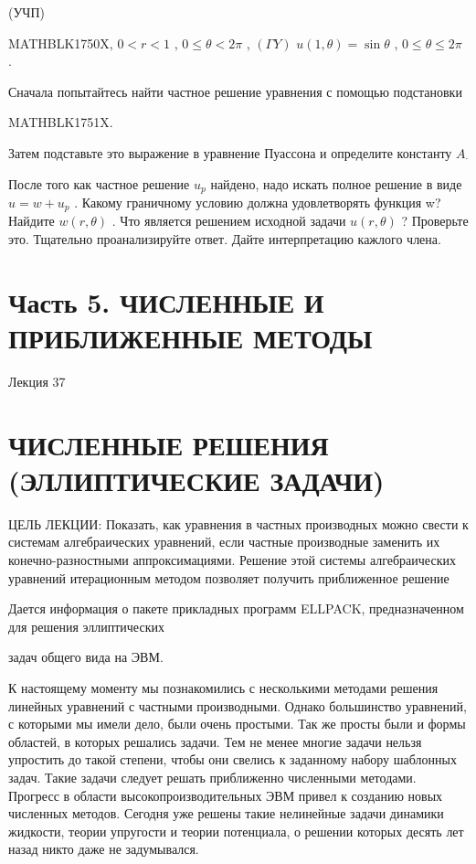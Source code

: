 \documentclass[
]{article}
\begin{document}
{{{(УЧП)

MATHBLK1750X, \(0 < r < 1\) , \(0 \le \theta < 2\pi\) , \((\Gamma Y)\)
\(u(1, \theta) = \sin \theta\) , \(0 \le \theta \le 2\pi\) .

Сначала попытайтесь найти частное решение уравнения с помощью
подстановки

MATHBLK1751X.

Затем подставьте это выражение в уравнение Пуассона и определите
константу \(A_{\cdot}\)

После того как частное решение \(u_p\) найдено, надо искать полное
решение в виде \(u=w+u_p\) . Какому граничному условию должна
удовлетворять функция w? Найдите \(w(r, \theta)\) . Что является
решением исходной задачи \(u(r, \theta)\) ? Проверьте это. Тщательно
проанализируйте ответ. Дайте интерпретацию кажлого члена.

\section{Часть 5. ЧИСЛЕННЫЕ И ПРИБЛИЖЕННЫЕ
МЕТОДЫ}\label{ux447ux430ux441ux442ux44c-5.-ux447ux438ux441ux43bux435ux43dux43dux44bux435-ux438-ux43fux440ux438ux431ux43bux438ux436ux435ux43dux43dux44bux435-ux43cux435ux442ux43eux434ux44b}

Лекция 37

\section{ЧИСЛЕННЫЕ РЕШЕНИЯ (ЭЛЛИПТИЧЕСКИЕ
ЗАДАЧИ)}\label{ux447ux438ux441ux43bux435ux43dux43dux44bux435-ux440ux435ux448ux435ux43dux438ux44f-ux44dux43bux43bux438ux43fux442ux438ux447ux435ux441ux43aux438ux435-ux437ux430ux434ux430ux447ux438}

ЦЕЛЬ ЛЕКЦИИ: Показать, как уравнения в частных производных можно свести
к системам алгебраических уравнений, если частные производные заменить
их конечно-разностными аппроксимациями. Решение этой системы
алгебраических уравнений итерационным методом позволяет получить
приближенное решение

Дается информация о пакете прикладных программ ELLPACK, предназначенном
для решения эллиптических

задач общего вида на ЭВМ.

К настоящему моменту мы познакомились с несколькими методами решения
линейных уравнений с частными производными. Однако большинство
уравнений, с которыми мы имели дело, были очень простыми. Так же просты
были и формы областей, в которых решались задачи. Тем не менее многие
задачи нельзя упростить до такой степени, чтобы они свелись к заданному
набору шаблонных задач. Такие задачи следует решать приближенно
численными методами. Прогресс в области высокопроизводительных ЭВМ
привел к созданию новых численных методов. Сегодня уже решены такие
нелинейные задачи динамики жидкости, теории упругости и теории
потенциала, о решении которых десять лет назад никто даже не
задумывался.

}}}
\end{document}
